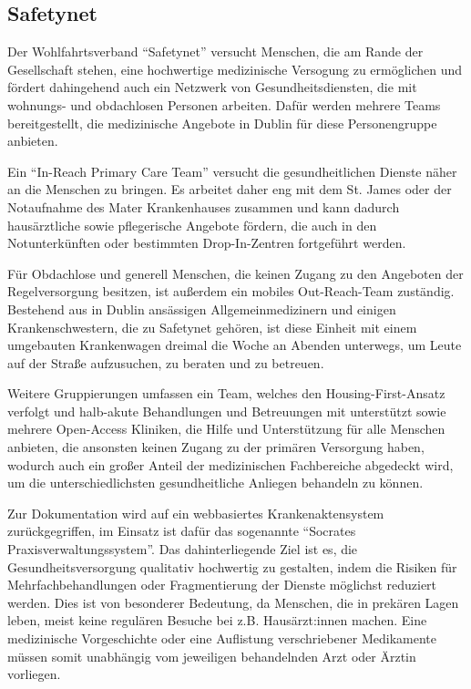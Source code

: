 \subsection{Safetynet}

Der Wohlfahrtsverband \enquote{Safetynet} versucht Menschen, die am Rande der Gesellschaft stehen, eine hochwertige medizinische Versogung zu ermöglichen und fördert dahingehend auch ein Netzwerk von Gesundheitsdiensten, die mit wohnungs- und obdachlosen Personen arbeiten. Dafür werden mehrere Teams bereitgestellt, die medizinische Angebote in Dublin für diese Personengruppe anbieten. 

Ein \enquote{In-Reach Primary Care Team} versucht die gesundheitlichen Dienste näher an die Menschen zu bringen. Es arbeitet daher eng mit dem St. James oder der Notaufnahme des Mater Krankenhauses zusammen und kann dadurch hausärztliche sowie pflegerische Angebote fördern, die auch in den Notunterkünften oder bestimmten Drop-In-Zentren fortgeführt werden.

Für Obdachlose und generell Menschen, die keinen Zugang zu den Angeboten der Regelversorgung besitzen, ist außerdem ein mobiles Out-Reach-Team zuständig. Bestehend aus in Dublin ansässigen Allgemeinmedizinern und einigen Krankenschwestern, die zu Safetynet gehören, ist diese Einheit mit einem umgebauten Krankenwagen dreimal die Woche an Abenden unterwegs, um Leute auf der Straße aufzusuchen, zu beraten und zu betreuen.

Weitere Gruppierungen umfassen ein Team, welches den Housing-First-Ansatz verfolgt und halb-akute Behandlungen und Betreuungen mit unterstützt sowie mehrere Open-Access Kliniken, die Hilfe und Unterstützung für alle Menschen anbieten, die ansonsten keinen Zugang zu der primären Versorgung haben, wodurch auch ein großer Anteil der medizinischen Fachbereiche abgedeckt wird, um die unterschiedlichsten gesundheitliche Anliegen behandeln zu können.

Zur Dokumentation wird auf ein webbasiertes Krankenaktensystem zurückgegriffen, im Einsatz ist dafür das sogenannte \enquote{Socrates Praxisverwaltungssystem}. Das dahinterliegende Ziel ist es, die Gesundheitsversorgung qualitativ hochwertig zu gestalten, indem die Risiken für Mehrfachbehandlungen oder Fragmentierung der Dienste möglichst reduziert werden. Dies ist von besonderer Bedeutung, da Menschen, die in prekären Lagen leben, meist keine regulären Besuche bei z.B. Hausärzt:innen machen. Eine medizinische Vorgeschichte oder eine Auflistung verschriebener Medikamente müssen somit unabhängig vom jeweiligen behandelnden Arzt oder Ärztin vorliegen. \citep{Safetynet.2022} \nocite{Safetynet}

